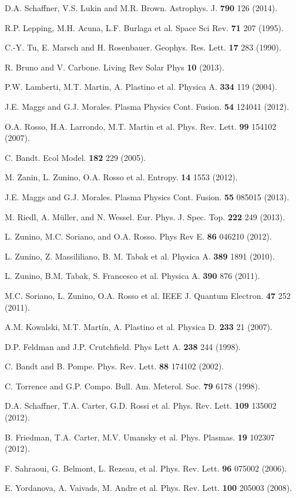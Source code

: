 \documentclass[aps,pre,twocolumn,secnumarabic,nobalancelastpage,amsmath,amssymb,
nofootinbib]{revtex4-1}
\begin{document}
\begin{thebibliography}{99}
D.A. Schaffner, V.S. Lukin and M.R. Brown. Astrophys. J. {\bf 790} 126 (2014).

R.P. Lepping, M.H. Acuna, L.F. Burlaga et al. Space Sci Rev. {\bf 71} 207 (1995).

C.-Y. Tu, E. Marsch and H. Rosenbauer. Geophys. Res. Lett. {\bf 17} 283 (1990).

R. Bruno and V. Carbone. Living Rev Solar Phys {\bf 10} (2013).

P.W. Lamberti, M.T. Martin, A. Plastino et al. Physica A. {\bf 334} 119 (2004).

J.E. Maggs and G.J. Morales. Plasma Physics Cont. Fusion. {\bf 54} 124041 (2012).

O.A. Rosso, H.A. Larrondo, M.T. Martin et al. Phys. Rev. Lett. {\bf 99} 154102 (2007).

C. Bandt. Ecol Model. {\bf 182} 229 (2005).

M. Zanin, L. Zunino, O.A. Rosso et al. Entropy. {\bf 14} 1553 (2012).

J.E. Maggs and G.J. Morales. Plasma Physics Cont. Fusion. {\bf 55} 085015 (2013).

M. Riedl, A. M{\"u}ller, and N. Wessel. Eur. Phys. J. Spec. Top. {\bf 222} 249 (2013).

L. Zunino, M.C. Soriano, and O.A. Rosso. Phys Rev E. {\bf 86} 046210 (2012).

L. Zunino, Z. Massililiano, B. M. Tabak et al. Physica A. {\bf 389} 1891 (2010).

L. Zunino, B.M. Tabak, S. Francesco et al. Physica A. {\bf 390} 876 (2011).

M.C. Soriano, L. Zunino, O.A. Rosso et al. IEEE J. Quantum Electron. {\bf 47} 252 (2011).

A.M. Kowalski, M.T. Mart{\'i}n, A. Plastino et al. Physica D. {\bf 233} 21 (2007).

D.P. Feldman and J.P. Crutchfield. Phys Lett A. {\bf 238} 244 (1998).

C. Bandt and B. Pompe. Phys. Rev. Lett. {\bf 88} 174102 (2002).

C. Torrence and G.P. Compo. Bull. Am. Meterol. Soc. {\bf 79} 6178 (1998).

D.A. Schaffner, T.A. Carter, G.D. Rossi et al. Phys. Rev. Lett. {\bf 109} 135002 (2012).

B. Friedman, T.A. Carter, M.V. Umansky et al. Phys. Plasmas. {\bf 19} 102307 (2012).

F. Sahraoui, G. Belmont, L. Rezeau, et al. Phys. Rev. Lett. {\bf 96} 075002 (2006).

E. Yordanova, A. Vaivads, M. Andre et al. Phys. Rev. Lett. {\bf 100} 205003 (2008).

\end{thebibliography}

%
%
\end{document}
